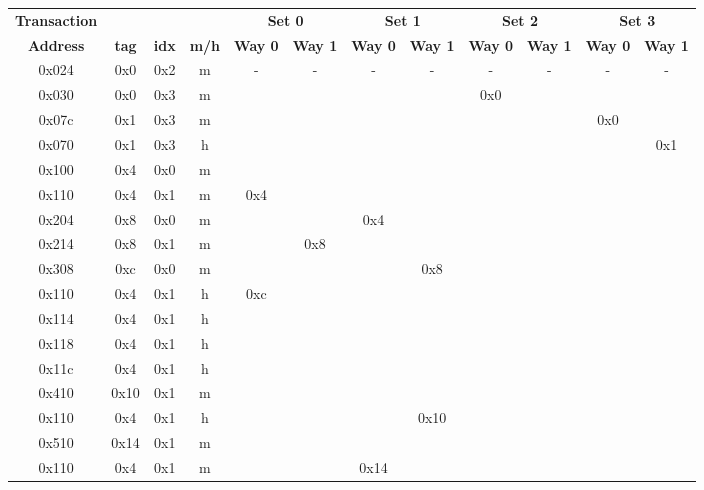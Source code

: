 \documentclass[10pt]{article}
\begin{document}
\begin{figure}[H]
\centering
{\setlength{\tabcolsep}{2pt}
\begin{tabular}{@{\extracolsep{3pt}}cccccccccccc@{}}
\Xhline{2\arrayrulewidth}
\textbf{Transaction} & & & & \multicolumn{2}{c}{\textbf{Set 0}} & \multicolumn{2}{c}{\textbf{Set 1}} & \multicolumn{2}{c}{\textbf{Set 2}} & \multicolumn{2}{c}{\textbf{Set 3}} \\
\cline{5-6}
\cline{7-8}
\cline{9-10}
\cline{11-12}
\textbf{Address} & \textbf{tag} & \textbf{idx} & \textbf{m/h} & \textbf{Way 0} & \textbf{Way 1} & \textbf{Way 0} & \textbf{Way 1} & \textbf{Way 0} & \textbf{Way 1} & \textbf{Way 0} & \textbf{Way 1} \\
\Xhline{2\arrayrulewidth}
0x024 & 0x0 & 0x2 & m &  -  &  -  &  -  &  -  &  -  &  -  &  -  &  -  \\
0x030 & 0x0 & 0x3 & m &     &     &     &     & 0x0 &     &     &     \\
0x07c & 0x1 & 0x3 & m &     &     &     &     &     &     & 0x0 &     \\
0x070 & 0x1 & 0x3 & h &     &     &     &     &     &     &     & 0x1 \\
0x100 & 0x4 & 0x0 & m &     &     &     &     &     &     &     &     \\
0x110 & 0x4 & 0x1 & m & 0x4 &     &     &     &     &     &     &     \\
0x204 & 0x8 & 0x0 & m &     &     & 0x4 &     &     &     &     &     \\
0x214 & 0x8 & 0x1 & m &     & 0x8 &     &     &     &     &     &     \\
0x308 & 0xc & 0x0 & m &     &     &     & 0x8 &     &     &     &     \\
0x110 & 0x4 & 0x1 & h & 0xc &     &     &     &     &     &     &     \\
0x114 & 0x4 & 0x1 & h &     &     &     &     &     &     &     &     \\
0x118 & 0x4 & 0x1 & h &     &     &     &     &     &     &     &     \\
0x11c & 0x4 & 0x1 & h &     &     &     &     &     &     &     &     \\
0x410 & 0x10& 0x1 & m &     &     &     &     &     &     &     &     \\
0x110 & 0x4 & 0x1 & h &     &     &     & 0x10&     &     &     &     \\
0x510 & 0x14& 0x1 & m &     &     &     &     &     &     &     &     \\
0x110 & 0x4 & 0x1 & m &     &     & 0x14&     &     &     &     &     \\

\end{tabular}}
\end{figure}
\end{document}
